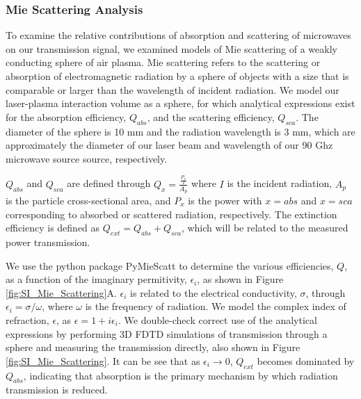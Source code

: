 \subsubsection{Mie Scattering Analysis}

To examine the relative contributions of absorption and scattering of microwaves on our transmission signal, we examined models of Mie scattering of a weakly conducting sphere of air plasma. Mie scattering refers to the scattering or absorption of electromagnetic radiation by a sphere of objects with a size that is comparable or larger than the wavelength of incident radiation.\cite{bohrenAbsorptionScatteringLight2007} We model our laser-plasma interaction volume as a sphere, for which analytical expressions exist for the absorption efficiency, $Q_{abs}$, and the scattering efficiency, $Q_{sca}$. The diameter of the sphere is 10 mm and the radiation wavelength is 3 mm, which are approximately the diameter of our laser beam and wavelength of our 90 Ghz microwave source source, respectively.  %

$Q_{abs}$ and $Q_{sca}$ are defined through $Q_x = \frac{\frac{P_x}{I}}{A_p}$ where $I$ is the incident radiation, $A_p$ is the particle cross-sectional area, and $P_x$ is the power with $x=abs$ and $x=sca$ corresponding to absorbed or scattered radiation, respectively.\cite{bohrenAbsorptionScatteringLight2007}  The extinction efficiency is defined as $Q_{ext} = Q_{abs} + Q_{sca}$, which will be related to the measured power transmission. %

We use the python package PyMieScatt to determine the various efficiencies, $Q$, as a function of the imaginary permitivity, $\epsilon_i$, as shown in Figure \ref{fig:SI_Mie_Scattering}A. $\epsilon_i$ is related to the electrical conductivity, $\sigma$, through $\epsilon_i = \sigma/\omega$, where $\omega$ is the frequency of radiation.\cite{coltonComplexWaveNumber2021}  We model the complex index of refraction, $\epsilon$, as $\epsilon = 1 + i\epsilon_i$. We double-check correct use of the analytical expressions by performing 3D FDTD simulations of transmission through a sphere and measuring the transmission directly, also shown in Figure \ref{fig:SI_Mie_Scattering}. It can be see that as $\epsilon_i \rightarrow 0$, $Q_{ext}$ becomes dominated by $Q_{abs}$, indicating that absorption is the primary mechanism by which radiation transmission is reduced.

